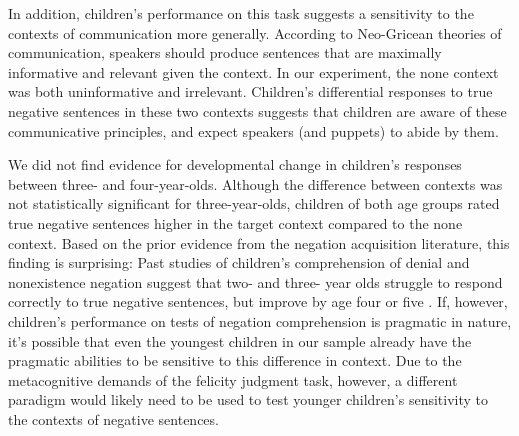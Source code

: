 \documentclass[man, noapacite]{apa2}
\begin{document}
In addition, children's performance on this task suggests a sensitivity to the contexts of communication more generally. According to Neo-Gricean theories of communication, speakers should produce sentences that are maximally informative and relevant given the context. In our experiment, the none context was both uninformative and irrelevant. Children's differential responses to true negative sentences in these two contexts suggests that children are aware of these communicative principles, and expect speakers (and puppets) to abide by them.

We did not find evidence for developmental change in children's responses between three- and four-year-olds. Although the difference between contexts was not statistically significant for three-year-olds, children of both age groups rated true negative sentences higher in the target context compared to the none context. Based on the prior evidence from the negation acquisition literature, this finding is surprising: Past studies of children's comprehension of denial and nonexistence negation suggest that two- and three- year olds struggle to respond correctly to true negative sentences, but improve by age four or five \cite{kim1985, nordmeyer2014b}. If, however, children's performance on tests of negation comprehension is pragmatic in nature, it's possible that even the youngest children in our sample already have the pragmatic abilities to be sensitive to this difference in context. Due to the metacognitive demands of the felicity judgment task, however, a different paradigm would likely need to be used to test younger children's sensitivity to the contexts of negative sentences.
\end{document}
